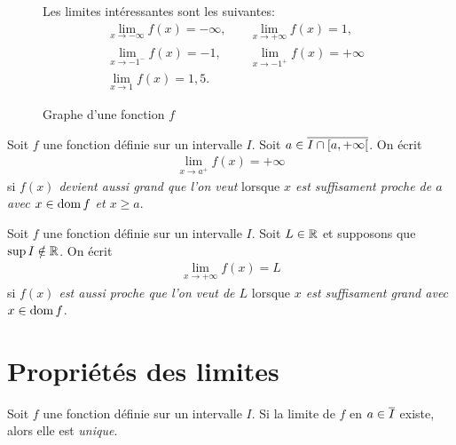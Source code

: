 \documentclass[main.tex]{subfiles}
\begin{document}
\begin{figure}
    \centering
    \begin{plot}{0.25}{-10}{-10}{10}{10}
    \end{plot}
    \caption{Graphe d'une fonction $f$}
    Les limites intéressantes sont les suivantes:
    \begin{align}
        &\lim_{x \to -\infty} f(x) = -\infty, \quad
        &\lim_{x \to +\infty} f(x) = 1,\\
        &\lim_{x \to -1^-} f(x) = -1, \quad
        &\lim_{x \to -1^+} f(x) = +\infty\\
        &\lim_{x \to 1} f(x) = 1,5.
    \end{align}
\end{figure}

\begin{definition}

    Soit $f$ une fonction définie sur un intervalle $I$.
    Soit $a \in \overline{I \cap [a, +\infty[}$.
    On écrit
    \begin{align}
        \lim_{x \to a^+} f(x) = +\infty
    \end{align}
    si \emph{$f(x)$ devient aussi grand que l'on veut}
    lorsque \emph{$x$ est suffisament proche de $a$ avec $x \in \operatorname{dom} f$ et $x \geq a$}.
\end{definition}

\begin{definition}

    Soit $f$ une fonction définie sur un intervalle $I$.
    Soit $L \in \mathbb{R}$ et supposons que $\sup I \notin \mathbb{R}$.
    On écrit
    \begin{align}
        \lim_{x \to +\infty} f(x) = L
    \end{align}
    si \emph{$f(x)$ est aussi proche que l'on veut de $L$}
    lorsque \emph{$x$ est suffisament grand avec $x \in \operatorname{dom} f$}.
\end{definition}

\section{Propriétés des limites}

\begin{proposition}

    Soit $f$ une fonction définie sur un intervalle $I$.
    Si la limite de $f$ en $a \in \overline{I}$ existe,
    alors elle est \emph{unique}.
\end{proposition}
\end{document}
